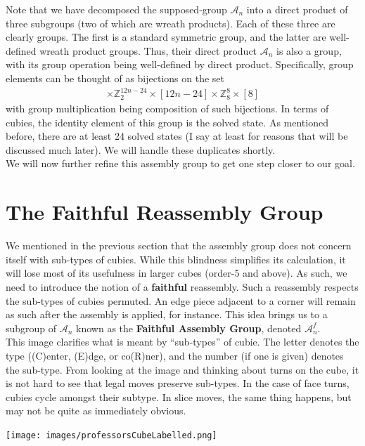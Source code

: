 \documentclass[10pt,letterpaper]{report}
\begin{document}
Note that we have decomposed the supposed-group $\mathcal{A}_n$ into a direct product of three subgroups (two of which are wreath products).  Each of these three are clearly groups.  The first is a standard symmetric group, and the latter are well-defined wreath product groups.  Thus, their direct product $\mathcal{A}_n$ is also a group, with its group operation being well-defined by direct product.  Specifically, group elements can be thought of as bijections on the set \begin{align*}
[6n^2 -24n + 24] \times \mathbb{Z}_2^{12n - 24} \times [12n - 24] \times \mathbb{Z}_8^{8} \times [8]
\end{align*}
with group multiplication being composition of such bijections.  In terms of cubies, the identity element of this group is the solved state.  As mentioned before, there are at least 24 solved states (I say at least for reasons that will be discussed much later).  We will handle these duplicates shortly.  \\

We will now further refine this assembly group to get one step closer to our goal.

\section{The Faithful Reassembly Group}
We mentioned in the previous section that the assembly group does not concern itself with sub-types of cubies.  While this blindness simplifies its calculation, it will lose most of its usefulness in larger cubes (order-5 and above).  As such, we need to introduce the notion of a \textbf{faithful} reassembly.  Such a reassembly respects the sub-types of cubies permuted.  An edge piece adjacent to a corner will remain as such after the assembly is applied, for instance.  This idea brings us to a subgroup of $\mathcal{A}_n$ known as the \textbf{Faithful Assembly Group}, denoted $\mathcal{A}_n^f$.  \\

This image clarifies what is meant by ``sub-types'' of cubie.  The letter denotes the type ((C)enter, (E)dge, or co(R)ner), and the number (if one is given) denotes the sub-type.  From looking at the image and thinking about turns on the cube, it is not hard to see that legal moves preserve sub-types.  In the case of face turns, cubies cycle amongst their subtype.  In slice moves, the same thing happens, but may not be quite as immediately obvious.

\begin{center}
\texttt{[image: images/professorsCubeLabelled.png]} 
\end{center}
\end{document}
